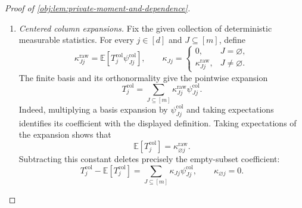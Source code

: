 \begin{proof}[Proof of \cref{obj:lem:private-moment-and-dependence}]
\begin{enumerate}
If \(J\ne J'\), a row in \(J\setminus J'\) or \(J'\setminus J\)
contributes a single centered factor. Factoring over independent rows
therefore gives, for any \(j,j'\in[d]\),
\[
\mathbb E[
\psi^{\mathrm{col}}_{Jj}\psi^{\mathrm{col}}_{J'j'}]=0.
\]
For equal subsets in the same column, row independence instead gives
\[
\mathbb E[(\psi^{\mathrm{col}}_{Jj})^2]
=
\prod_{i\in J}\mathbb E[(\psi^{\mathrm{row}}_{ij})^2]
=
1.
\]
Consequently,
\[
\mathbb E[
\psi^{\mathrm{col}}_{Jj}\psi^{\mathrm{col}}_{J'j}]
=
\begin{cases}
1,&J=J',\\
0,&J\ne J',
\end{cases}
\qquad
\mathbb E[\psi^{\mathrm{col}}_{Jj}]
=
\begin{cases}
1,&J=\varnothing,\\
0,&J\ne\varnothing.
\end{cases}
\]
For each \(j\), these functions of the column are linearly independent by
orthonormality. Their number equals the dimension of the real function
space on the column patterns:
\[
\#\{J:J\subseteq[m]\}
=
2^m
=
\dim_{\mathbb R}\mathbb R^{\{-b,b\}^m}.
\]
They therefore form a basis of that function space.

\item \textit{Centered column expansions.}
Fix the given collection of deterministic measurable statistics.
For every \(j\in[d]\) and \(J\subseteq[m]\), define
\[
\kappa^{\mathrm{raw}}_{Jj}
=
\mathbb E[T_j^{\mathrm{col}}\psi^{\mathrm{col}}_{Jj}],
\qquad
\kappa_{Jj}
=
\begin{cases}
0,&J=\varnothing,\\
\kappa^{\mathrm{raw}}_{Jj},&J\ne\varnothing.
\end{cases}
\]
The finite basis and its orthonormality give the pointwise expansion
\[
T_j^{\mathrm{col}}
=
\sum_{J\subseteq[m]}
\kappa^{\mathrm{raw}}_{Jj}\psi^{\mathrm{col}}_{Jj}.
\]
Indeed, multiplying a basis expansion by
\(\psi^{\mathrm{col}}_{Jj}\) and taking expectations identifies its
coefficient with the displayed definition.
Taking expectations of the expansion shows that
\[
\mathbb E[T_j^{\mathrm{col}}]
=
\kappa^{\mathrm{raw}}_{\varnothing j}.
\]
Subtracting this constant deletes precisely the empty-subset coefficient:
\[
T_j^{\mathrm{col}}-\mathbb E[T_j^{\mathrm{col}}]
=
\sum_{J\subseteq[m]}
\kappa_{Jj}\psi^{\mathrm{col}}_{Jj},
\qquad
\kappa_{\varnothing j}=0.
\]


\end{enumerate}
\end{proof}
